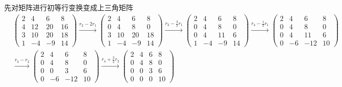 \documentclass[12pt, a4paper, oneside, UTF8]{ctexbook}
\begin{document}
\begin{solution}
    先对矩阵进行初等行变换变成上三角矩阵
            \begin{align*}
                &\begin{pmatrix}
                    2&4&6&8\\
                    4&12&20&16\\
                    3&10&20&18\\
                    1&-4&-9&14
                \end{pmatrix}\xrightarrow{r_2-2r_1}
                \begin{pmatrix}
                    2&4&6&8\\
                    0&4&8&0\\
                    3&10&20&18\\
                    1&-4&-9&14
                \end{pmatrix}\xrightarrow{r_3-\frac{3}{2}r_1}
                \begin{pmatrix}
                    2&4&6&8\\
                    0&4&8&0\\
                    0&4&11&6\\
                    1&-4&-9&14
                \end{pmatrix}\xrightarrow{r_4-\frac{1}{2}r_1}
                \begin{pmatrix}
                    2&4&6&8\\
                    0&4&8&0\\
                    0&4&11&6\\
                    0&-6&-12&10
                \end{pmatrix}\\
                &\xrightarrow{r_3-r_2}
                \begin{pmatrix}
                    2&4&6&8\\
                    0&4&8&0\\
                    0&0&3&6\\
                    0&-6&-12&10
                \end{pmatrix}\xrightarrow{r_4+\frac{3}{2}r_2}
                \begin{pmatrix}
                    2&4&6&8\\
                    0&4&8&0\\
                    0&0&3&6\\
                    0&0&0&10

\end{pmatrix}
\end{align*}
\end{solution}
\end{document}
